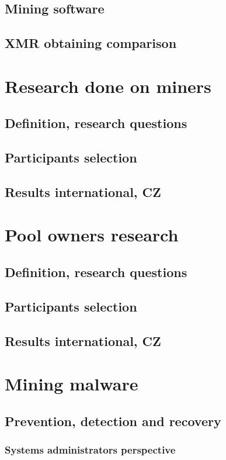 \documentclass[
  printed, %
  table,   %
  nolof,     %
  nolot,     %
           oneside, color
]{fithesis3}
\begin{document}
\section{Mining software}
\section{XMR obtaining comparison}

\chapter{Research done on miners}
\section{Definition, research questions}
\section{Participants selection}
\section{Results international, CZ}



\chapter{Pool owners research}
\section{Definition, research questions}
\section{Participants selection}
\section{Results international, CZ}

 
\chapter{Mining malware}
\section{Prevention, detection and recovery}
\subsection{Systems administrators perspective}
\end{document}
